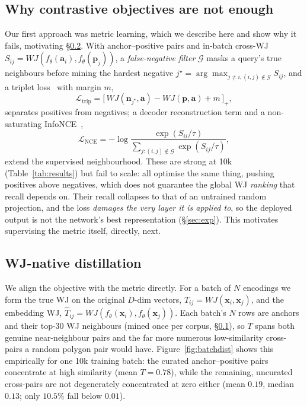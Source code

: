 \documentclass[sigconf]{acmart}
\begin{document}
\subsection{Why contrastive objectives are not enough}
\label{sec:contrastive}
Our first approach was metric learning, which we describe here and show why it
fails, motivating \S\ref{sec:distill}. With anchor--positive pairs and in-batch
cross-WJ $S_{ij}=WJ(f_\theta(\mathbf{a}_i),f_\theta(\mathbf{p}_j))$, a
\emph{false-negative filter} $\mathcal{G}$ masks a query's true neighbours before
mining the hardest negative
$j^\star=\arg\max_{j\neq i,(i,j)\notin\mathcal{G}}S_{ij}$, and a triplet
loss~\cite{schroff15} with margin $m$,
\begin{equation}
  \mathcal{L}_{\mathrm{trip}}=\big[\,WJ(\mathbf{n}_{j^\star},\mathbf{a})
     -WJ(\mathbf{p},\mathbf{a})+m\,\big]_{+},
  \label{eq:triplet}
\end{equation}
separates positives from negatives; a decoder reconstruction term and a
non-saturating InfoNCE~\cite{oord18},
\begin{equation}
  \mathcal{L}_{\mathrm{NCE}}=-\log\frac{\exp(S_{ii}/\tau)}
       {\sum_{j:(i,j)\notin\mathcal{G}}\exp(S_{ij}/\tau)},
  \label{eq:infonce}
\end{equation}
extend the supervised neighbourhood. These are strong at 10k
(Table~\ref{tab:results}) but fail to scale: all optimise the same thing,
pushing positives above negatives, which does not guarantee the global WJ
\emph{ranking} that recall depends on. Their recall collapses to that of an
untrained random projection, and the loss \emph{damages the very layer it is
applied to}, so the deployed output is not the network's best representation
(\S\ref{sec:exp}). This motivates supervising the metric itself, directly, next.

\subsection{WJ-native distillation}
\label{sec:distill}
We align the objective with the metric directly. For a batch of $N$ encodings we
form the true WJ on the original $D$-dim vectors, $T_{ij}=WJ(\mathbf{x}_i,\mathbf{x}_j)$,
and the embedding WJ, $\hat T_{ij}=WJ(f_\theta(\mathbf{x}_i),f_\theta(\mathbf{x}_j))$.
Each batch's $N$ rows are anchors and their top-30 WJ neighbours (mined once per
corpus, \S\ref{sec:contrastive}), so $T$ spans both genuine near-neighbour pairs and
the far more numerous low-similarity cross-pairs a random polygon pair would have.
Figure~\ref{fig:batchdist} shows this empirically for one 10k training batch: the
curated anchor--positive pairs concentrate at high similarity (mean $T{=}0.78$),
while the remaining, uncurated cross-pairs are not degenerately concentrated at
zero either (mean $0.19$, median $0.13$; only $10.5\%$ fall below $0.01$).
\end{document}
